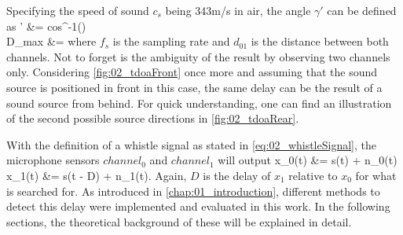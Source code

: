 Specifying the speed of sound $c_s$ being 343\si{m/s} in air, the angle
$\gamma'$ can be defined as
\bsub \bal
    \gamma' &= cos^{-1}\left(\right)
    \label{eq:02_tdoaAngle}\\
    D_{max} &= 
\eal \esub
where $f_s$ is the sampling rate and $d_{01}$ is the distance between both channels.
Not to forget is the ambiguity of the result by observing two channels only.
Considering \cref{fig:02_tdoaFront} once more and assuming that the sound source
is positioned in front in this case, the same delay can be the result of a
sound source from behind.
For quick understanding, one can find an illustration of the second possible
source directions in \cref{fig:02_tdoaRear}.


With the definition of a whistle signal as stated in \cref{eq:02_whistleSignal},
the microphone sensors $channel_0$ and $channel_1$ will output
\bsub
\label{eq:02_signalTimeDomain}
\bal
    x_0(t) &= s(t) + n_0(t)\\
    x_1(t) &= \alpha s(t - D) + n_1(t).
\eal \esub
Again, $D$ is the delay of $x_1$ relative to $x_0$ for what is searched for.
As introduced in \cref{chap:01_introduction}, different methods to detect this delay
were implemented and evaluated in this work.
In the following sections, the theoretical background of these will be
explained in detail.